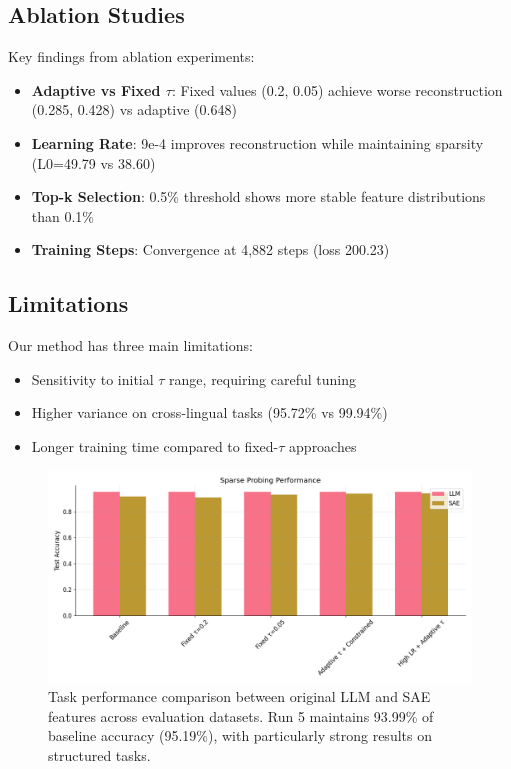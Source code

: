 \documentclass{article} %
\begin{document}
\subsection{Ablation Studies}
Key findings from ablation experiments:
\begin{itemize}
    \item \textbf{Adaptive vs Fixed $\tau$}: Fixed values (0.2, 0.05) achieve worse reconstruction (0.285, 0.428) vs adaptive (0.648)
    \item \textbf{Learning Rate}: 9e-4 improves reconstruction while maintaining sparsity (L0=49.79 vs 38.60)
    \item \textbf{Top-k Selection}: 0.5\% threshold shows more stable feature distributions than 0.1\%
    \item \textbf{Training Steps}: Convergence at 4,882 steps (loss 200.23)
\end{itemize}

\subsection{Limitations}
Our method has three main limitations:
\begin{itemize}
    \item Sensitivity to initial $\tau$ range, requiring careful tuning
    \item Higher variance on cross-lingual tasks (95.72\% vs 99.94\%)
    \item Longer training time compared to fixed-$\tau$ approaches
\end{itemize}


\begin{figure}[t]
    \centering
    \includegraphics[width=\linewidth]{sparse_probing_comparison.png}
    \caption{Task performance comparison between original LLM and SAE features across evaluation datasets. Run 5 maintains 93.99\% of baseline accuracy (95.19\%), with particularly strong results on structured tasks.}
    \label{fig:sparse_probing}
\end{figure}
\end{document}
